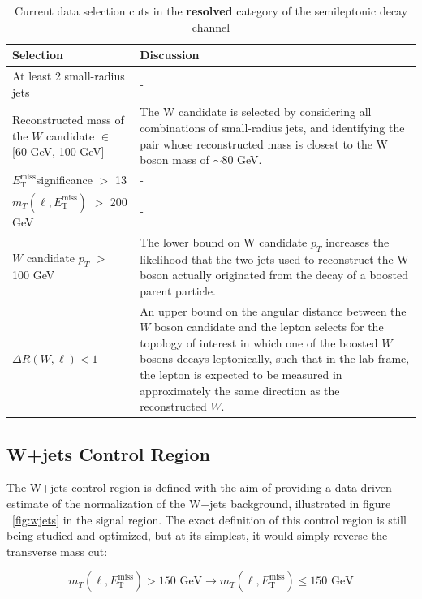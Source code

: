 \documentclass[12pt]{article}
\newcommand*{\met}{\ensuremath{E_\text{T}^\text{miss}}}
\begin{document}
\begin{table}[H]
\centering
\caption{Current data selection cuts in the \textbf{resolved} category of the semileptonic decay channel}
\label{tab:resolved_cuts}
\begin{footnotesize}
\renewcommand{\arraystretch}{1.5}
\begin{tabular}{|p{50mm}|p{100mm}|}
\hline
\textbf{Selection} & \textbf{Discussion}  \\ \hline
At least 2 small-radius jets & -     \\ \hline
Reconstructed mass of the $W$ candidate $\in$ [60 GeV, 100 GeV]     & The W candidate is selected by considering all combinations of small-radius jets, and identifying the pair whose reconstructed mass is closest to the W boson mass of $\sim$80 GeV.        \\ \hline
\met significance $>$ 13    & -        \\ \hline
$m_T(\ell, \met)$ $>$ 200 GeV    & -        \\ \hline
 $W$ candidate $p_T$ $>$ 100 GeV    & The lower bound on W candidate $p_T$ increases the likelihood that the two jets used to reconstruct the W boson actually originated from the decay of a boosted parent particle.   \\ \hline
$\Delta R(W, \ell) < 1$   & An upper bound on the angular distance between the $W$ boson candidate and the lepton selects for the topology of interest in which one of the boosted $W$ bosons decays leptonically, such that in the lab frame, the lepton is expected to be measured in approximately the same direction as the reconstructed $W$.   \\ \hline
\end{tabular}
\end{footnotesize}
\end{table}

\subsection{W+jets Control Region}

The W+jets control region is defined with the aim of providing a data-driven estimate of the normalization of the W+jets background, illustrated in figure ~\ref{fig:wjets} in the signal region. The exact definition of this control region is still being studied and optimized, but at its simplest, it would simply reverse the transverse mass cut: 

$$
m_T(\ell, \met)>150\text{ GeV} \rightarrow m_T(\ell, \met)\leq 150\text{ GeV}
$$
\end{document}
